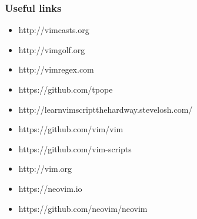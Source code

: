 \documentclass{beamer}
\begin{document}
\begin{frame}
    \frametitle{Useful links}
    \begin{itemize}
        \item http://vimcasts.org
        \item http://vimgolf.org
        \item http://vimregex.com
        \item https://github.com/tpope
        \item http://learnvimscriptthehardway.stevelosh.com/
        \item https://github.com/vim/vim
        \item https://github.com/vim-scripts
        \item http://vim.org
        \item https://neovim.io
        \item https://github.com/neovim/neovim
    \end{itemize}
\end{frame}
\end{document}
